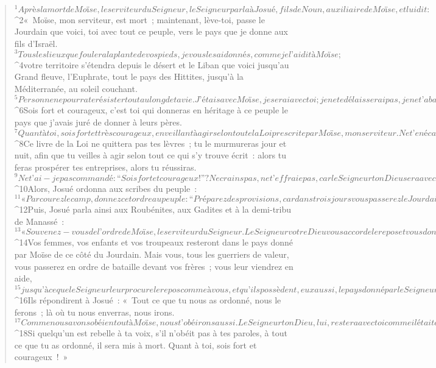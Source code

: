   
  
    
      
         
      \bchapter{}
      \begin{verse}
${}^{1}Après la mort de Moïse, le serviteur du Seigneur, le Seigneur parla à Josué, fils de Noun, auxiliaire de Moïse, et lui dit : 
${}^{2}« Moïse, mon serviteur, est mort ; maintenant, lève-toi, passe le Jourdain que voici, toi avec tout ce peuple, vers le pays que je donne aux fils d’Israël. 
${}^{3}Tous les lieux que foulera la plante de vos pieds, je vous les ai donnés, comme je l’ai dit à Moïse ; 
${}^{4}votre territoire s’étendra depuis le désert et le Liban que voici jusqu’au Grand fleuve, l’Euphrate, tout le pays des Hittites, jusqu’à la Méditerranée, au soleil couchant. 
${}^{5}Personne ne pourra te résister tout au long de ta vie. J’étais avec Moïse, je serai avec toi ; je ne te délaisserai pas, je ne t’abandonnerai pas. 
${}^{6}Sois fort et courageux, c’est toi qui donneras en héritage à ce peuple le pays que j’avais juré de donner à leurs pères. 
${}^{7}Quant à toi, sois fort et très courageux, en veillant à agir selon toute la Loi prescrite par Moïse, mon serviteur. Ne t’en écarte ni à droite ni à gauche, pour réussir partout où tu iras. 
${}^{8}Ce livre de la Loi ne quittera pas tes lèvres ; tu le murmureras jour et nuit, afin que tu veilles à agir selon tout ce qui s’y trouve écrit : alors tu feras prospérer tes entreprises, alors tu réussiras. 
${}^{9}Ne t’ai-je pas commandé : “Sois fort et courageux !” ? Ne crains pas, ne t’effraie pas, car le Seigneur ton Dieu sera avec toi partout où tu iras. »
      
         
${}^{10}Alors, Josué ordonna aux scribes du peuple : 
${}^{11}« Parcourez le camp, donnez cet ordre au peuple : “Préparez des provisions, car dans trois jours vous passerez le Jourdain que voici, pour aller prendre possession de la terre que le Seigneur votre Dieu vous donne en héritage.” »
${}^{12}Puis, Josué parla ainsi aux Roubénites, aux Gadites et à la demi-tribu de Manassé : 
${}^{13}« Souvenez-vous de l’ordre de Moïse, le serviteur du Seigneur. Le Seigneur votre Dieu vous accorde le repos et vous donne ce pays. 
${}^{14}Vos femmes, vos enfants et vos troupeaux resteront dans le pays donné par Moïse de ce côté du Jourdain. Mais vous, tous les guerriers de valeur, vous passerez en ordre de bataille devant vos frères ; vous leur viendrez en aide, 
${}^{15}jusqu’à ce que le Seigneur leur procure le repos comme à vous, et qu’ils possèdent, eux aussi, le pays donné par le Seigneur votre Dieu. Alors, vous retournerez dans le pays qui est le vôtre, et vous posséderez ce pays que Moïse, le serviteur du Seigneur, vous a donné de ce côté du Jourdain, au soleil levant. » 
${}^{16}Ils répondirent à Josué : « Tout ce que tu nous as ordonné, nous le ferons ; là où tu nous enverras, nous irons. 
${}^{17}Comme nous avons obéi en tout à Moïse, nous t’obéirons aussi. Le Seigneur ton Dieu, lui, restera avec toi comme il était avec Moïse. 
${}^{18}Si quelqu’un est rebelle à ta voix, s’il n’obéit pas à tes paroles, à tout ce que tu as ordonné, il sera mis à mort. Quant à toi, sois fort et courageux ! »
      

\end{verse}
